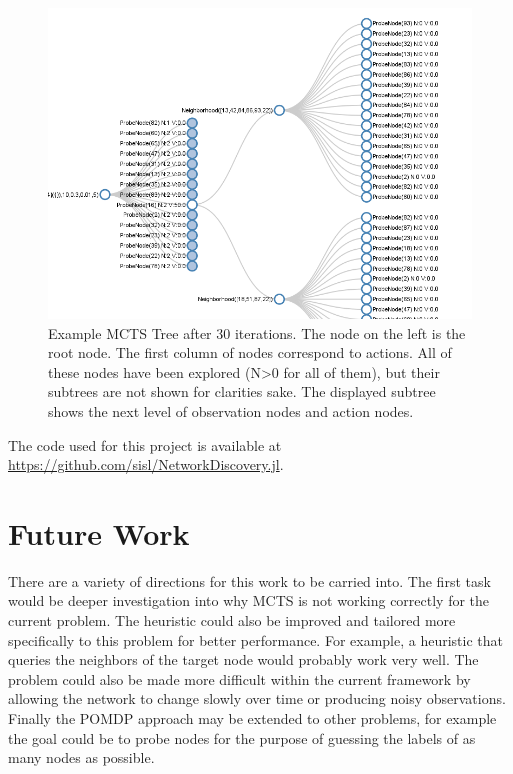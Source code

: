 \documentclass{IEEEtran}
\begin{document}
\begin{figure}[tb]
    \centering
    \includegraphics[width=\columnwidth]{POMCPTree.png}
    \caption{Example MCTS Tree after 30 iterations. The node on the left is the root node. The first column of nodes correspond to actions. All of these nodes have been explored (N>0 for all of them), but their subtrees are not shown for clarities sake. The displayed subtree shows the next level of observation nodes and action nodes.}
    \label{fig:tree}
\end{figure}

The code used for this project is available at \url{https://github.com/sisl/NetworkDiscovery.jl}.

\section{Future Work}

There are a variety of directions for this work to be carried into. The first task would be deeper investigation into why MCTS is not working correctly for the current problem. The heuristic could also be improved and tailored more specifically to this problem for better performance. For example, a heuristic that queries the neighbors of the target node would probably work very well. The problem could also be made more difficult within the current framework by allowing the network to change slowly over time or producing noisy observations. Finally the POMDP approach may be extended to other problems, for example the goal could be to probe nodes for the purpose of guessing the labels of as many nodes as possible.



\end{document}
